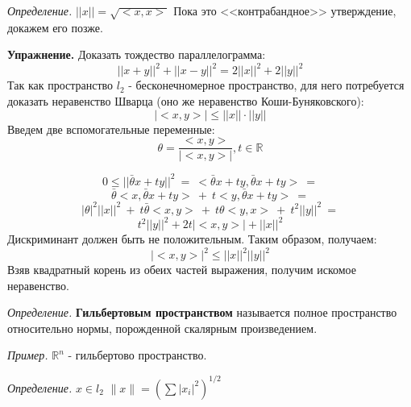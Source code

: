 \documentclass[12pt]{article}
\newcommand{\example}{{\itshape Пример. }}
\newcommand{\defi}{{\itshape Определение. }}
\newcommand{\exc}{{\bfseries Упражнение. }}
\renewcommand{\leq}{\leqslant}
\begin{document}
	\defi $||x|| = \sqrt{<x, x>}$ {\color{gray} Пока это <<контрабандное>> утверждение, докажем его позже.}
	
	\exc Доказать тождество параллелограмма: 
	$$||x+y||^2 + ||x-y||^2 = 2 ||x||^2 + 2 ||y||^2$$
	Так как пространство $l_2$ - бесконечномерное пространство, для него потребуется доказать неравенство Шварца (оно же неравенство
	Коши-Буняковского):
	$$|<x, y>| \leq ||x|| \cdot ||y||$$
	Введем две вспомогательные переменные:
	$$\theta = \frac{<x, y>}{|<x, y>|}, t \in \mathbb{R}$$
	
	$$0 \leq ||\bar{\theta} x + t y||^2 ~=~ <\bar{\theta} x + t y, \bar{\theta} x + t y> ~= $$
	$$\bar{\theta} <x, \bar{\theta} x + t y> ~+~ t <y, \bar{\theta} x + t y> ~= $$
	$$|\theta|^2 ||x||^2 ~+~ t \bar{\theta} <x, y> ~+~ t \theta <y, x> ~+~ t^2 ||y||^2 ~= $$
	$$t^2 ||y||^2 + 2t |<x,y>| + ||x||^2$$
	Дискриминант должен быть не положительным. Таким образом, получаем:
	$$|<x, y>|^2 \leq ||x||^2 ||y||^2$$
	Взяв квадратный корень из обеих частей выражения, получим искомое неравенство.
	
	\defi \textbf{Гильбертовым пространством} называется полное пространство относительно нормы, порожденной скалярным произведением.
	
	\example $\mathbb{R}^n$ - гильбертово пространство.
	
	\defi $x \in l_2$ $\|x\| = (\sum{|x_i|^2})^{1/2}$ 
\end{document}
